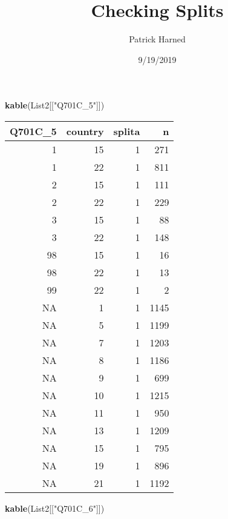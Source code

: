 \documentclass[]{article}
\title{Checking Splits}
\author{Patrick Harned}
\date{9/19/2019}
\newenvironment{Shaded}{\begin{snugshade}}{\end{snugshade}}
\newcommand{\KeywordTok}[1]{\textcolor[rgb]{0.13,0.29,0.53}{\textbf{#1}}}
\newcommand{\NormalTok}[1]{#1}
\newcommand{\StringTok}[1]{\textcolor[rgb]{0.31,0.60,0.02}{#1}}
\begin{document}
\maketitle

\begin{Shaded}
\begin{Highlighting}[]
\KeywordTok{kable}\NormalTok{(List2[[}\StringTok{"Q701C_5"}\NormalTok{]])}
\end{Highlighting}
\end{Shaded}

\begin{tabular}{r|r|r|r}
\hline
Q701C\_5 & country & splita & n\\
\hline
1 & 15 & 1 & 271\\
\hline
1 & 22 & 1 & 811\\
\hline
2 & 15 & 1 & 111\\
\hline
2 & 22 & 1 & 229\\
\hline
3 & 15 & 1 & 88\\
\hline
3 & 22 & 1 & 148\\
\hline
98 & 15 & 1 & 16\\
\hline
98 & 22 & 1 & 13\\
\hline
99 & 22 & 1 & 2\\
\hline
NA & 1 & 1 & 1145\\
\hline
NA & 5 & 1 & 1199\\
\hline
NA & 7 & 1 & 1203\\
\hline
NA & 8 & 1 & 1186\\
\hline
NA & 9 & 1 & 699\\
\hline
NA & 10 & 1 & 1215\\
\hline
NA & 11 & 1 & 950\\
\hline
NA & 13 & 1 & 1209\\
\hline
NA & 15 & 1 & 795\\
\hline
NA & 19 & 1 & 896\\
\hline
NA & 21 & 1 & 1192\\
\hline
\end{tabular}

\begin{Shaded}
\begin{Highlighting}[]
\KeywordTok{kable}\NormalTok{(List2[[}\StringTok{"Q701C_6"}\NormalTok{]])}
\end{Highlighting}
\end{Shaded}
\end{document}

